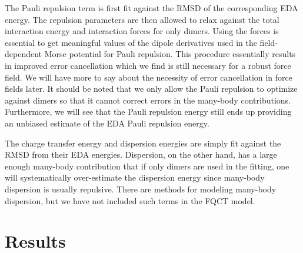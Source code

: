 \documentclass[journal=jctcce,manuscript=article]{achemso}
\begin{document}
The Pauli repulsion term is first fit against the RMSD of the corresponding EDA energy. The repulsion parameters are then allowed to relax against the total interaction energy and interaction forces for only dimers. Using the forces is essential to get meaningful values of the dipole derivatives used in the field-dependent Morse potential for Pauli repulsion. This procedure essentially results in improved error cancellation which we find is still necessary for a robust force field. We will have more to say about the necessity of error cancellation in force fields later. It should be noted that we only allow the Pauli repulsion to optimize against dimers so that it cannot correct errors in the many-body contributions. Furthermore, we will see that the Pauli repulsion energy still ends up providing an unbiased estimate of the EDA Pauli repulsion energy.

The charge transfer energy and dispersion energies are simply fit against the RMSD from their EDA energies. Dispersion, on the other hand, has a large enough many-body contribution that if only dimers are used in the fitting, one will systematically over-estimate the dispersion energy since many-body dispersion is usually repulsive. There are methods for modeling many-body dispersion, but we have not included such terms in the FQCT model.\cite{anatole2010two,van2018new} 

\section*{Results}
\end{document}

